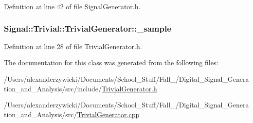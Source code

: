 Definition at line 42 of file Signal\+Generator.\+h.

\hypertarget{classSignal_1_1Trivial_1_1TrivialGenerator_a2e43e1ae605338b92e48974a681866e9}{
\subsubsection[{\+\_\+sample}]{ Signal\+::\+Trivial\+::\+Trivial\+Generator\+::\+\_\+sample\hspace{0.3cm}{\ttfamily [protected]}}}\label{classSignal_1_1Trivial_1_1TrivialGenerator_a2e43e1ae605338b92e48974a681866e9}


Definition at line 28 of file Trivial\+Generator.\+h.



The documentation for this class was generated from the following files\+:\begin{DoxyCompactItemize}
\item 
/\+Users/alexanderzywicki/\+Documents/\+School\+\_\+\+Stuff/\+Fall\+\_/\+Digital\+\_\+\+Signal\+\_\+\+Generation\+\_\+and\+\_\+\+Analysis/src/include/\hyperlink{TrivialGenerator_8h}{Trivial\+Generator.\+h}\item 
/\+Users/alexanderzywicki/\+Documents/\+School\+\_\+\+Stuff/\+Fall\+\_/\+Digital\+\_\+\+Signal\+\_\+\+Generation\+\_\+and\+\_\+\+Analysis/src/\hyperlink{TrivialGenerator_8cpp}{Trivial\+Generator.\+cpp}\end{DoxyCompactItemize}
